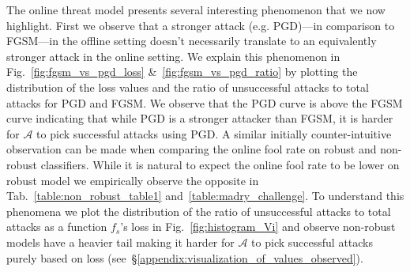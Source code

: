  The online threat model presents several interesting phenomenon that we now highlight. First we observe that a stronger attack (e.g. PGD)---in comparison to FGSM---in the offline setting doesn't necessarily translate to an equivalently stronger attack in the online setting. We explain this phenomenon in Fig.~\ref{fig:fgsm_vs_pgd_loss} \&~\ref{fig:fgsm_vs_pgd_ratio} by plotting the distribution of the loss values and the ratio of unsuccessful attacks to total attacks for PGD and FGSM. We observe that the PGD curve is above the FGSM curve indicating that while PGD is a stronger attacker than FGSM, it is harder for $\mathcal{A}$ to pick successful attacks using PGD. A similar initially counter-intuitive observation can be made when comparing the online fool rate on robust and non-robust classifiers. While it is natural to expect the online fool rate to be lower on robust model we empirically observe the opposite in Tab.~\ref{table:non_robust_table1} and~\ref{table:madry_challenge}. To understand this phenomena we plot the distribution of the ratio of unsuccessful attacks to total attacks as a function $f_s$'s loss in Fig.~\ref{fig:histogram_Vi} and observe non-robust models have a heavier tail making it harder for $\mathcal{A}$ to pick successful attacks purely based on loss (see~\S\ref{appendix:visualization_of_values_observed}). 
